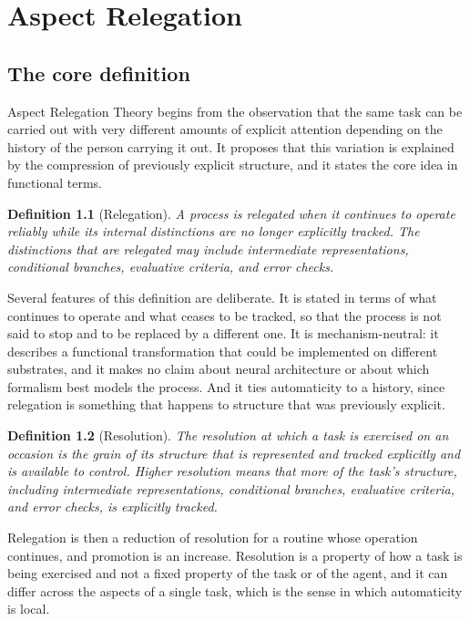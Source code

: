 \documentclass[11pt]{report}
\newtheorem{definition}{Definition}[chapter]
\theoremstyle{remark}
\theoremstyle{definition}
\begin{document}
\chapter{Aspect Relegation}\label{ch:relegation}

\section{The core definition}

Aspect Relegation Theory begins from the observation that the same task can be carried out with very different amounts of explicit attention depending on the history of the person carrying it out. It proposes that this variation is explained by the compression of previously explicit structure, and it states the core idea in functional terms.

\begin{definition}[Relegation]
A process is \emph{relegated} when it continues to operate reliably while its internal distinctions are no longer explicitly tracked. The distinctions that are relegated may include intermediate representations, conditional branches, evaluative criteria, and error checks.
\end{definition}

Several features of this definition are deliberate. It is stated in terms of what continues to operate and what ceases to be tracked, so that the process is not said to stop and to be replaced by a different one. It is mechanism-neutral: it describes a functional transformation that could be implemented on different substrates, and it makes no claim about neural architecture or about which formalism best models the process. And it ties automaticity to a history, since relegation is something that happens to structure that was previously explicit.

\begin{definition}[Resolution]
The \emph{resolution} at which a task is exercised on an occasion is the grain of its structure that is represented and tracked explicitly and is available to control. Higher resolution means that more of the task's structure, including intermediate representations, conditional branches, evaluative criteria, and error checks, is explicitly tracked.
\end{definition}

Relegation is then a reduction of resolution for a routine whose operation continues, and promotion is an increase. Resolution is a property of how a task is being exercised and not a fixed property of the task or of the agent, and it can differ across the aspects of a single task, which is the sense in which automaticity is local.
\end{document}
